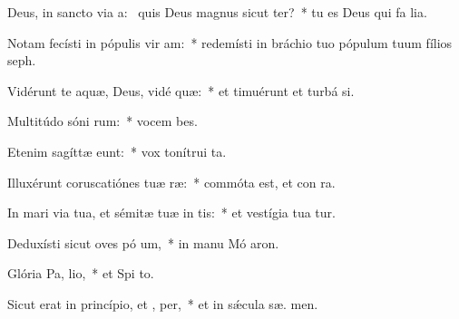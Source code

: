\item Deus, in sancto via a:~\pscross{} quis Deus magnus sicut  ter?~* tu es Deus qui fa lia.
\item Notam fecísti in pópulis vir am:~* redemísti in bráchio tuo pópulum tuum fílios   seph.
\item Vidérunt te aquæ, Deus, vidé  quæ:~* et timuérunt et turbá  si.
\item Multitúdo sóni rum:~* vocem  bes.
\item Etenim sagíttæ  eunt:~* vox tonítrui   ta.
\item Illuxérunt coruscatiónes tuæ  ræ:~* commóta est, et con ra.
\item In mari via tua, et sémitæ tuæ in  tis:~* et vestígia tua  tur.
\item Deduxísti sicut oves pó um,~* in manu Mó  aron.
\item Glória Pa,  lio,~* et Spi to.
\item Sicut erat in princípio, et ,  per,~* et in sǽcula sæ. men.
